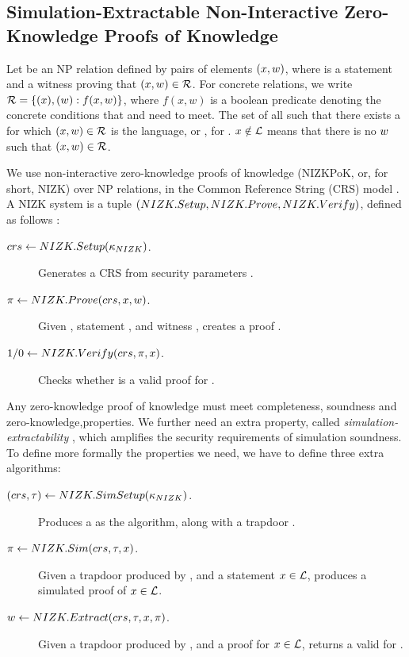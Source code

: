 
\subsection{Simulation-Extractable Non-Interactive Zero-Knowledge
  Proofs of Knowledge}
\label{sapp:nizk}

Let \NIZKRel be an NP relation defined by pairs of elements $(x,w)$,
where \NIZKx is a statement and \NIZKw a witness proving that $(x,w)
\in \mathcal{R}$. For concrete relations, we write $\mathcal{R} = \lbrace (x),
(w): f(x,w) \rbrace$, where $f(x,w)$ is a boolean predicate denoting the
concrete conditions that \NIZKx and \NIZKw need to meet. The set of all \NIZKx
such that there exists a \NIZKw for which $(x,w) \in \mathcal{R}$ is the
language, or \NIZKLang, for \NIZKRel. $x \notin \mathcal{L}$ means that
there is no $w$ such that $(x,w) \in \mathcal{R}$.

We use non-interactive zero-knowledge proofs of knowledge (NIZKPoK, or, for
short, NIZK) over NP relations, in the Common Reference String (CRS) model
\needcite. A NIZK system is a tuple $(NIZK.Setup,NIZK.Prove,NIZK.Verify)$,
defined as follows \cite{gos06}:

\begin{description}
\item[$crs \gets NIZK.Setup(\kappa_{NIZK})$.] Generates a CRS \NIZKcrs from
  security parameters \NIZKsecpar.
\item[$\pi \gets NIZK.Prove(crs,x,w)$.] Given \NIZKcrs,
  statement \NIZKx, and witness \NIZKw, creates a proof \NIZKproof.
\item[$1/0 \gets NIZK.Verify(crs,\pi,x)$.] Checks whether
  \NIZKproof is a valid proof for \NIZKx.
\end{description}

Any zero-knowledge proof of knowledge must meet completeness, soundness and
zero-knowledge,properties. We further need an extra property, called
\emph{simulation-extractability} \cite{cl06}, which amplifies the security
requirements of simulation soundness.
%
To define more formally the properties we need, we have to define three extra
algorithms:

\begin{description}
\item[$(crs,\tau) \gets NIZK.SimSetup(\kappa_{NIZK})$.] Produces a
  \NIZKcrs as the \NIZKSetup algorithm, along with a trapdoor \NIZKtrap.
\item[$\pi \gets NIZK.Sim(crs,\tau,x)$.] Given a trapdoor
  \NIZKtrap produced by \NIZKSimSetup, and a statement $x \in \mathcal{L}$,
  produces a simulated proof \NIZKproof of $x \in \mathcal{L}$.
\item[$w \gets NIZK.Extract(crs,\tau,x,\pi)$.] Given
  a trapdoor \NIZKtrap produced by \NIZKSimSetup, and a proof \NIZKproof for
  $x \in \mathcal{L}$, returns a valid \NIZKw for \NIZKx.
\end{description}

